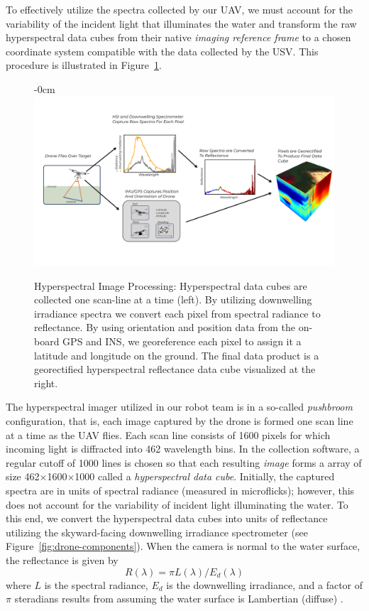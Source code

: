\documentclass[remotesensing,article,submit,pdftex,moreauthors]{Definitions/mdpi}
\begin{document}
To effectively utilize the spectra collected by our UAV, we must account for the variability of the incident light that illuminates the water and transform the raw hyperspectral data cubes from their native \textit{imaging reference frame} to a chosen coordinate system compatible with the data collected by the USV. This procedure is illustrated in Figure~\ref{fig:hsi-pipeline}.

\begin{figure}[H]
\begin{adjustwidth}{-\extralength}{0cm}
\centering
\includegraphics[width=14cm]{paper/figures/materials-and-methods/pipeline-figure-2.pdf}
\end{adjustwidth}
\caption{Hyperspectral Image Processing: Hyperspectral data cubes are collected one scan-line at a time (left). By utilizing downwelling irradiance spectra we convert each pixel from spectral radiance to reflectance. By using orientation and position data from the on-board GPS and INS, we georeference each pixel to assign it a latitude and longitude on the ground. The final data product is a georectified hyperspectral reflectance data cube visualized at the right. \label{fig:hsi-pipeline}}
\end{figure}  

The hyperspectral imager utilized in our robot team is in a so-called \textit{pushbroom} configuration, that is, each image captured by the drone is formed one scan line at a time as the UAV flies. Each scan line consists of 1600 pixels for which incoming light is diffracted into 462 wavelength bins. In the collection software, a regular cutoff of 1000 lines is chosen so that each resulting \textit{image} forms a array of size 462$\times$1600$\times$1000 called a \textit{hyperspectral data cube}. Initially, the captured spectra are in units of spectral radiance (measured in microflicks); however, this does not account for the variability of incident light illuminating the water. To this end, we convert the hyperspectral data cubes into units of reflectance utilizing the skyward-facing downwelling irradiance spectrometer (see Figure~\ref{fig:drone-components}). When the camera is normal to the water surface, the reflectance is given by
\begin{equation}
    R(\lambda) = \pi L(\lambda)/E_d(\lambda)
\end{equation}
where $L$ is the spectral radiance, $E_d$ is the downwelling irradiance, and a factor of $\pi$ steradians results from assuming the water surface is Lambertian (diffuse) \cite{reflectance-conversion}. 
\end{document}
